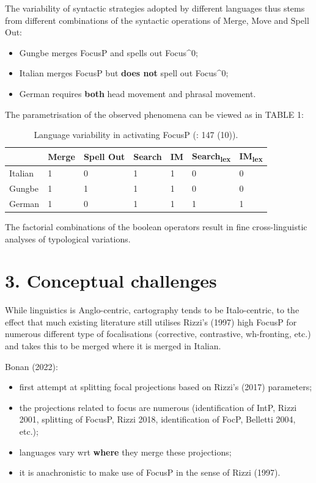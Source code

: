 \documentclass[fleqn,10pt]{wlscirep}
\begin{document}
\noindent The variability of syntactic strategies adopted by different languages thus stems from different combinations of the syntactic operations of Merge, Move and Spell Out: 

\begin{itemize}
\item[\ding{227}] Gungbe merges FocusP and spells out Focus^0; 
\item[\ding{227}] \vspace*{-2mm} Italian merges FocusP but \textbf{does not} spell out Focus^0; 
\item[\ding{227}] \vspace*{-2mm} German requires \textbf{both} head movement and phrasal movement. 
\end{itemize}

\noindent The parametrisation of the observed phenomena can be viewed as in TABLE 1:

\begin{table}[H]
    \centering
    \begin{tabular}{|l|l|l|l|l|l|l|}
    \hline
     & Merge & Spell Out & Search & IM & Search\textsubscript{lex} & IM\textsubscript{lex} \\
    \hline
    Italian & 1 & 0 & 1 & 1 & 0 & 0 \\
    \hline
    Gungbe & 1 & 1 & 1 & 1 & 0 & 0 \\
    \hline
    German & 1 & 0 & 1 & 1 & 1 & 1 \\
    \hline
    \end{tabular}
    \caption{\label{tab:samp}Language variability in activating FocusP (\citealt{samo2019cartography}: 147 (10)).}
    \end{table}

\noindent The factorial combinations of the boolean operators result in fine cross-linguistic analyses of typological variations.

\section*{3. Conceptual challenges}

While linguistics is Anglo-centric, cartography tends to be Italo-centric, to the effect that much existing literature still utilises Rizzi's (1997) high FocusP for numerous different type of focalisations (corrective, contrastive, wh-fronting, etc.) and takes this to be merged where it is merged in Italian. 

\noindent Bonan (2022): 
\begin{itemize}
\item[\ding{227}] first attempt at splitting focal projections based on Rizzi's (2017) parameters;   
\item[\ding{227}] the projections related to focus are numerous (identification of IntP, Rizzi 2001, splitting of FocusP, Rizzi 2018, identification of FocP, Belletti 2004, etc.);
\item[\ding{227}] languages vary wrt \textbf{where} they merge these projections;
\item[\ding{227}] it is anachronistic to make use of FocusP in the sense of Rizzi (1997).
\end{itemize}
\end{document}
